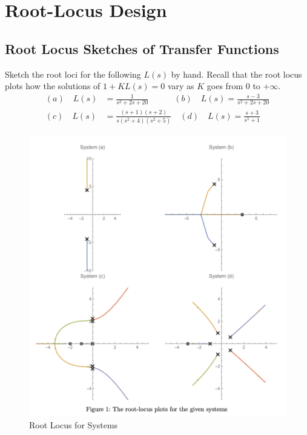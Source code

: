 \documentclass[12pt]{article}
\begin{document}
\section{Root-Locus Design}
\subsection{Root Locus Sketches of Transfer Functions}

Sketch the root loci for the following $L(s)$ by hand. Recall that the root locus plots how the solutions of $1+K L(s)=0$ vary as $K$ goes from 0 to $+\infty$.
\begin{align*}
    (a) \quad L(s)&=\frac{1}{s^2+2 s+20} \quad \qquad (b) \quad L(s)=\frac{s-3}{s^2+2 s+20} \\
    (c) \quad L(s)&=\frac{(s+1)(s+2)}{s\left(s^2+4\right)\left(s^2+5\right)}  \quad (d) \quad L(s)=\frac{s+3}{s^5+1}
\end{align*}

\begin{figure}[h!]
    \centering
    \includegraphics[width=0.55\linewidth]{figs/7.1.png}
    \caption{Root Locus for Systems}
    \label{fig:prb3}
\end{figure}
\end{document}
